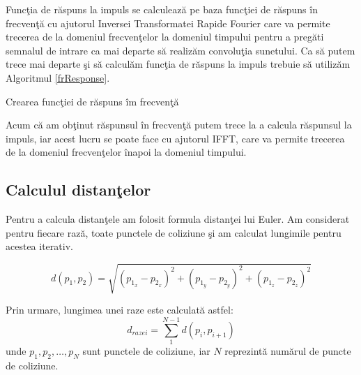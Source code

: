 	Func\c{t}ia de r\u{a}spuns la impuls se calculeaz\u{a} pe baza func\c{t}iei de r\u{a}spuns \^{i}n frecven\c{t}\u{a} cu ajutorul Inversei Transformatei Rapide Fourier care va permite trecerea de la domeniul frecven\c{t}elor la domeniul timpului pentru a preg\u{a}ti semnalul de intrare ca mai departe s\u{a} realiz\u{a}m convolu\c{t}ia sunetului.
	Ca s\u{a} putem trece mai departe \c{s}i s\u{a} calcul\u{a}m func\c{t}ia de r\u{a}spuns la impuls trebuie s\u{a} utiliz\u{a}m Algoritmul \ref{frResponse}.
	
	\begin{algorithm}
		\caption{Crearea func\c{t}iei de r\u{a}spuns \^{i}m frecven\c{t}\u{a}}
		\label{frResponse}
		\begin{algorithmic}[3]	
			\EndFor
			\EndFor
			\EndProcedure
		\end{algorithmic}
	\end{algorithm}
	\bigskip
	
	Acum c\u{a} am ob\c{t}inut r\u{a}spunsul \^{i}n frecven\c{t}\u{a} putem trece la a calcula r\u{a}spunsul la impuls, iar acest lucru se poate face cu ajutorul IFFT, care va permite trecerea de la domeniul frecven\c{t}elor \^{i}napoi la domeniul timpului.
	
\subsection{Calculul distan\c{t}elor}

	Pentru a calcula distan\c{t}ele am folosit formula distan\c{t}ei lui Euler. Am considerat pentru fiecare raz\u{a}, toate punctele de coliziune \c{s}i am calculat lungimile pentru acestea iterativ.
	\bigskip
	
	\begin{equation}
		d(p_1, p_2) = \sqrt{(p_{1_x} - p_{2_x})^2 + (p_{1_y} - p_{2_y})^2 + (p_{1_z} - p_{2_z})^2}
	\end{equation}
	\bigskip
	
	Prin urmare, lungimea unei raze este calculat\u{a} astfel:
	\begin{equation}
		d_{razei} = \sum_{1}^{N-1}{d(p_i, p_{i+1})}
	\end{equation}
	unde $p_1, p_2, \dots, p_{N}$ sunt punctele de coliziune, iar $N$ reprezint\u{a} num\u{a}rul de puncte de coliziune.

